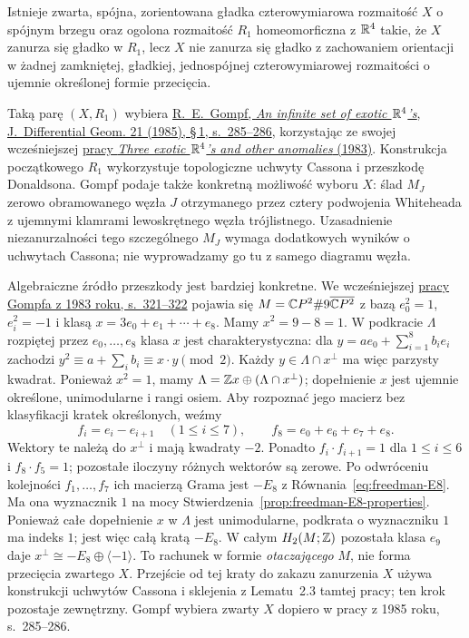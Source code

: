 \begin{twierdzenie}
\label{thm:egzotyczne-r4-X}
Istnieje zwarta, spójna, zorientowana gładka
czterowymiarowa rozmaitość $X$ o spójnym brzegu
oraz ogolona rozmaitość $R_1$ homeomorficzna
z $\mathbb{R}^4$ takie, że $X$ zanurza się gładko w $R_1$,
lecz $X$ nie zanurza się gładko z zachowaniem
orientacji w żadnej zamkniętej, gładkiej,
jednospójnej czterowymiarowej rozmaitości
o ujemnie określonej formie przecięcia.
\end{twierdzenie}

Taką parę $(X,R_1)$ wybiera
\href{https://doi.org/10.4310/jdg/1214439566}
{R.~E.~Gompf, \emph{An infinite set of exotic
$\mathbb{R}^4$'s}, J.~Differential Geom. 21 (1985),
\S\,1, s.~285--286}, korzystając ze swojej wcześniejszej
\href{https://doi.org/10.4310/jdg/1214437666}
{pracy \emph{Three exotic $\mathbb{R}^4$'s and other
anomalies} (1983)}. Konstrukcja początkowego
$R_1$ wykorzystuje topologiczne uchwyty Cassona
i przeszkodę Donaldsona. Gompf podaje także
konkretną możliwość wyboru $X$: ślad $M_J$
zerowo obramowanego węzła $J$ otrzymanego przez
cztery podwojenia Whiteheada z ujemnymi klamrami
lewoskrętnego węzła trójlistnego. Uzasadnienie
niezanurzalności tego szczególnego $M_J$ wymaga
dodatkowych wyników o uchwytach Cassona; nie
wyprowadzamy go tu z samego diagramu węzła.

Algebraiczne źródło przeszkody jest bardziej
konkretne. We wcześniejszej
\href{https://doi.org/10.4310/jdg/1214437666}
{pracy Gompfa z 1983 roku, s.~321--322}
pojawia się
$M=\mathbb{C} P^2\#9\overline{\mathbb{C} P^2}$ z bazą
$e_0^2=1$, $e_i^2=-1$ i klasą
$x=3e_0+e_1+\cdots+e_8$. Mamy $x^2=9-8=1$.
W podkracie $\Lambda$ rozpiętej przez
$e_0,\ldots,e_8$ klasa $x$ jest charakterystyczna:
dla
$y=a e_0+\sum_{i=1}^8b_i e_i$ zachodzi
$y^2\equiv a+\sum_i b_i\equiv x\cdot y\pmod2$.
Każdy $y\in\Lambda\cap x^\perp$ ma więc parzysty
kwadrat. Ponieważ $x^2=1$, mamy
$\Lambda=\mathbb{Z} x\oplus(\Lambda\cap x^\perp)$;
dopełnienie $x$ jest ujemnie określone,
unimodularne i rangi osiem. Aby rozpoznać
jego macierz bez klasyfikacji kratek określonych,
weźmy
\[
 f_i=e_i-e_{i+1}\quad(1\leq i\leq7),
 \qquad f_8=e_0+e_6+e_7+e_8.
\]
Wektory te należą do $x^\perp$ i mają kwadraty
$-2$. Ponadto $f_i\cdot f_{i+1}=1$ dla
$1\leq i\leq6$ i $f_8\cdot f_5=1$; pozostałe
iloczyny różnych wektorów są zerowe. Po
odwróceniu kolejności $f_1,\ldots,f_7$ ich
macierzą Grama jest $-E_8$ z
Równania~\eqref{eq:freedman-E8}. Ma ona wyznacznik
$1$ na mocy Stwierdzenia~\ref{prop:freedman-E8-properties}.
Ponieważ całe dopełnienie $x$ w $\Lambda$ jest
unimodularne, podkrata o wyznaczniku $1$ ma
indeks $1$; jest więc całą kratą $-E_8$. W całym
$H_2(M;\mathbb{Z})$ pozostała klasa $e_9$ daje
$x^\perp\cong-E_8\oplus\langle-1\rangle$.
To rachunek w formie \emph{otaczającego} $M$,
nie forma przecięcia zwartego $X$.
Przejście od tej kraty do zakazu zanurzenia $X$
używa konstrukcji uchwytów Cassona i sklejenia
z Lematu~2.3 tamtej pracy; ten krok pozostaje
zewnętrzny. Gompf wybiera zwarty $X$ dopiero
w pracy z 1985 roku, s.~285--286.

